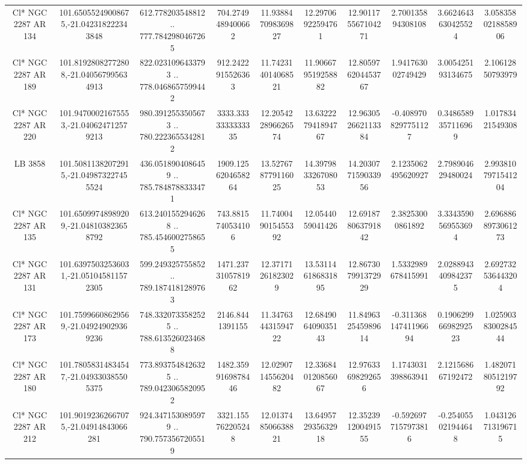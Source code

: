 \begin{table}
\begin{tabular}{cccccccccc}
Cl* NGC 2287     AR     134 & 101.65055249008675,-21.042318222343848 & 612.778203548812 .. 777.7842980467265 & 704.2749489400662 & 11.938847098369827 & 12.29706922594761 & 12.901175567104271 & 2.700135894308108 & 3.6624643630425524 & 3.0583580218858906 \\
Cl* NGC 2287     AR     189 & 101.81928082772808,-21.040567995634913 & 822.0231096433793 .. 778.0468657599442 & 912.2422915526363 & 11.742314014068521 & 11.906679519258882 & 12.805976204453767 & 1.941763002749429 & 3.005425193134675 & 2.10612850793979 \\
Cl* NGC 2287     AR     220 & 101.94700021675553,-21.040624712579213 & 980.3912553505673 .. 780.2223655342812 & 3333.3333333333335 & 12.205422896626574 & 13.632227941894767 & 12.963052662113384 & -0.4089708297751127 & 0.3486589357116969 & 1.01783421549308 \\
LB  3858 & 101.50811382072915,-21.049873227455524 & 436.0518904086459 .. 785.7848788333471 & 1909.1256204658264 & 13.527678779116025 & 14.397983326708053 & 14.203077159033956 & 2.1235062495620927 & 2.798904629480024 & 2.9938107971541204 \\
Cl* NGC 2287     AR     135 & 101.65099748989209,-21.048103823658792 & 613.2401552946268 .. 785.4546002758655 & 743.8815740534106 & 11.740049015455392 & 12.0544059041426 & 12.691878063791842 & 2.38253000861892 & 3.3343590569553694 & 2.6968868973061273 \\
Cl* NGC 2287     AR     131 & 101.63975032536031,-21.051045811572305 & 599.249325755852 .. 789.1874181289763 & 1471.2373105781962 & 12.37171261823029 & 13.531146186831895 & 12.867307991372929 & 1.5332989678415991 & 2.0288943409842375 & 2.692732536443204 \\
Cl* NGC 2287     AR     173 & 101.75996608629569,-21.049249029369236 & 748.3320733582525 .. 788.6135260234688 & 2146.8441391155 & 11.347634431594722 & 12.684906409035143 & 11.849632545989614 & -0.31136814741196694 & 0.19062996698292523 & 1.0259038300284544 \\
Cl* NGC 2287     AR     180 & 101.78058314834547,-21.049330385505375 & 773.8937548426325 .. 789.0423065820952 & 1482.3599169878446 & 12.029071455620482 & 12.336840120856067 & 12.97633698292656 & 1.1743031398863941 & 2.121568667192472 & 1.4820718051219792 \\
Cl* NGC 2287     AR     212 & 101.90192362667075,-21.04914843066281 & 924.3471530895979 .. 790.7573567205519 & 3321.155762205248 & 12.013748506638821 & 13.649572935632918 & 12.352391200491555 & -0.5926977157973816 & -0.254055021944648 & 1.043126713196715 \\

\end{tabular}
\end{table}
